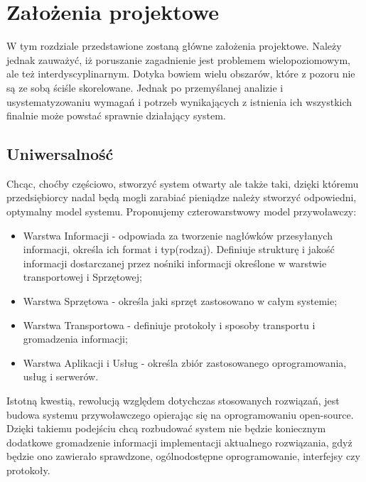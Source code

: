 \documentclass[12pt]{article} %
\begin{document}
\section{Założenia projektowe} %

W tym rozdziale przedstawione zostaną główne założenia projektowe. Należy jednak zauważyć, iż poruszanie zagadnienie jest problemem wielopoziomowym, ale też interdyscyplinarnym. Dotyka bowiem wielu obszarów, które z pozoru nie są ze sobą ściśle skorelowane. Jednak po przemyślanej analizie i usystematyzowaniu wymagań i potrzeb wynikających z istnienia ich wszystkich finalnie może powstać sprawnie działający system.

\subsection{Uniwersalność}
Chcąc, choćby częściowo, stworzyć system otwarty ale także taki, dzięki któremu przedsiębiorcy nadal będą mogli zarabiać pieniądze należy stworzyć odpowiedni, optymalny model systemu. Proponujemy czterowarstwowy model przywoławczy:
\begin{itemize}
\item Warstwa Informacji - odpowiada za tworzenie nagłówków przesyłanych informacji, określa ich format i typ(rodzaj). Definiuje strukturę i jakość informacji  dostarczanej przez nośniki informacji określone w warstwie transportowej i Sprzętowej;
\item Warstwa Sprzętowa - określa jaki sprzęt zastosowano w całym systemie;
\item Warstwa Transportowa - definiuje protokoły i sposoby transportu i gromadzenia informacji;
\item Warstwa Aplikacji i Usług - określa zbiór zastosowanego oprogramowania, usług i serwerów.
\end{itemize}

Istotną kwestią, rewolucją względem dotychczas stosowanych rozwiązań, jest budowa systemu przywoławczego opierając się na oprogramowaniu open-source. Dzięki takiemu podejściu chcą rozbudować system nie będzie koniecznym dodatkowe gromadzenie informacji implementacji aktualnego rozwiązania, gdyż będzie ono zawierało sprawdzone, ogólnodostępne oprogramowanie, interfejsy czy protokoły.
\end{document}
